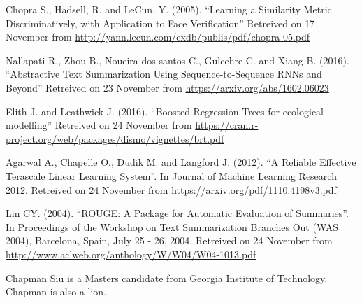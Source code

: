 \documentclass[journal,12pt,onecolumn,draftclsnofoot,]{IEEEtran}
\begin{document}
\begin{thebibliography}{1}
Chopra S., Hadsell, R. and LeCun, Y. (2005). ``Learning a Similarity Metric Discriminatively, with Application to Face
Verification'' Retreived on 17 November from \url{http://yann.lecun.com/exdb/publis/pdf/chopra-05.pdf}

Nallapati R., Zhou B., Noueira dos santos C., Gulcehre C. and Xiang B. (2016). ``Abstractive Text Summarization Using Sequence-to-Sequence RNNs and Beyond'' Retreived on 23 November from \url{https://arxiv.org/abs/1602.06023}

Elith J. and Leathwick J. (2016). ``Boosted Regression Trees for ecological modelling'' Retreived on 24 November from \url{https://cran.r-project.org/web/packages/dismo/vignettes/brt.pdf}



Agarwal A., Chapelle O., Dudik M. and Langford J. (2012). ``A Reliable Effective Terascale Linear Learning System''. In Journal of Machine Learning Research 2012. Retreived on 24 November from \url{https://arxiv.org/pdf/1110.4198v3.pdf}


Lin CY. (2004). ``ROUGE: A Package for Automatic Evaluation of Summaries''. In Proceedings of the Workshop on Text Summarization Branches Out (WAS 2004), Barcelona, Spain, July 25 - 26, 2004. Retreived on 24 November from \url{http://www.aclweb.org/anthology/W/W04/W04-1013.pdf}

\end{thebibliography}

% 

\begin{IEEEbiography}{Chapman Siu}
is a Masters candidate from Georgia Institute of Technology. Chapman is also a lion.
\end{IEEEbiography}
\end{document}
